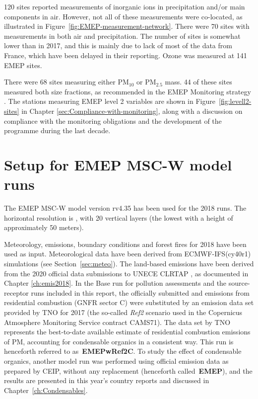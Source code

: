 120 sites reported measurements of inorganic ions in precipitation and/or main components in air. However, not all of these measurements were co-located, as illustrated in Figure~\ref{fig:EMEP-measurement-network}. There were 70 sites with measurements in both air and precipitation. The number of sites is somewhat lower than in 2017, and this is mainly due to lack of most of the data from France, which have been delayed in their reporting. Ozone was measured at 141 EMEP sites.

There were 68 sites measuring either PM$_{10}$ or PM$_{2.5}$ mass. 44 of these sites measured both size fractions, as recommended in the EMEP Monitoring strategy \citep{MonStrat2019}. The stations measuring EMEP level 2 variables are shown in Figure~\ref{fig:levell2-sites} in Chapter \ref{sec:Compliance-with-monitoring}, along with a discussion on compliance with the monitoring obligations and the development of the programme during the last decade.

\section{Setup for EMEP MSC-W model runs}
\label{Mod_2018}

The EMEP MSC-W model version rv4.35 has been used for the 2018
runs. The horizontal resolution is \resZO, with 20 vertical layers
(the lowest with a height of approximately 50 meters).

 Meteorology, emissions, boundary conditions and forest fires for 2018 have been
 used as input. Meteorological data have been
 derived from ECMWF-IFS(cy40r1) simulations (see Section~\ref{sec:meteo}). The
 land-based emissions have been derived from the 2020 official data
 submissions to UNECE CLRTAP \citep{CEIP2020}, as documented in
 Chapter \ref{ch:emis2018}. In the Base run for pollution assessments and the source-receptor runs included in this report, the officially submitted \PM[10] and \PM[2.5] emissions from residential combustion (GNFR sector C) were substituted by an emission data set provided by TNO for 2017 (the so-called \textit{Ref2} scenario used in the Copernicus Atmosphere Monitoring Service contract CAMS71). The data set by TNO represents the best-to-date available estimate of residential combustion emissions of PM, accounting for condensable organics in a consistent way. This run is henceforth referred to as~\textbf{EMEPwRef2C}. To study the effect of condensable organics, another model run was performed using official emission data as prepared by CEIP, without any replacement (henceforth called~\textbf{EMEP}), and the results are presented in this year's country reports \citep{Klein:2020} and discussed in Chapter~\ref{ch:Condensables}.
 

